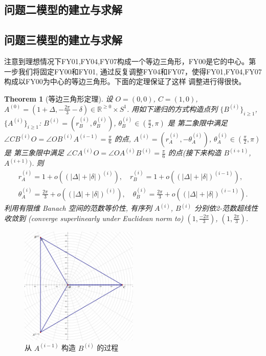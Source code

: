\documentclass{my_paper}
\newcommand{\R}{\mathbb{R}}
\newtheorem{theorem}{Theorem}
\begin{document}
\subsection{问题二模型的建立与求解}

\subsection{问题三模型的建立与求解}
    注意到理想情况下FY01,FY04,FY07构成一个等边三角形，FY00是它的中心。第一步我们将固定FY00和FY01,
    通过反复调整FY04和FY07，使得FY01,FY04,FY07构成以FY00为中心的等边三角形。下面的定理保证了这样
    调整进行得很快。
\begin{theorem}[等边三角形定理]
\label{dbsjx} 
    设 $O=(0,0)$, $C=(1,0)$,   
    $A^{(0)}=(1+\Delta,-\frac{2\pi}3-\delta)\in \R^{\geq 0}\times S^1$. 用如下递归的方式构造点列
    $\{B^{(i)}\}_{i\geq 1}$, $\{A^{(i)}\}_{i\geq 1}$: 
    $B^{(i)}=(r_B^{(i)},\theta_B^{(i)})$, $\theta_{B}^{(i)}\in (\frac \pi 2,\pi)$ 是
    第二象限中满足 $\angle CB^{(i)}O=\angle OB^{(i)}A^{(i-1)}=\frac\pi6$ 的点, 
    $A^{(i)}=(r_A^{(i)},-\theta_A^{(i)})$, $\theta_{A}^{(i)}\in (\frac \pi 2,\pi)$ 是
    第三象限中满足 $\angle CA^{(i)}O=\angle OA^{(i)}B^{(i)}=\frac\pi6$ 的点(接下来构造 $B^{(i+1)}$, $A^{(i+1)})$. 
    则 
    \begin{equation}
    \begin{aligned}
        r_A^{(i)}=1+o((|\Delta|+|\delta|)^{(i)}),\quad r_B^{(i)}=1+o((|\Delta|+|\delta|)^{(i-1)}),
        \\
        \theta_A^{(i)}=\frac{2\pi}{3}+o((|\Delta|+|\delta|)^{(i)}),\quad \theta_B^{(i)}=\frac{2\pi}{3}+o((|\Delta|+|\delta|)^{(i-1)}).
    \end{aligned}
    \label{1}
    \end{equation}
    利用有限维 Banach 空间的范数等价性, 有序列 $A^{(i)}$, $B^{(i)}$ 分别依2-范数超线性收敛到
    (converge superlinearly under Euclidean norm to) $(1,\frac{-2\pi}3)$, $(1,\frac{2\pi}3)$.
\end{theorem} 

\begin{figure}[h]
    \centering
    \includegraphics[width=0.5\textwidth]{sketch1}
    \caption{从 $A^{(i-1)}$ 构造 $B^{(i)}$ 的过程} 
\end{figure}
\end{document}
